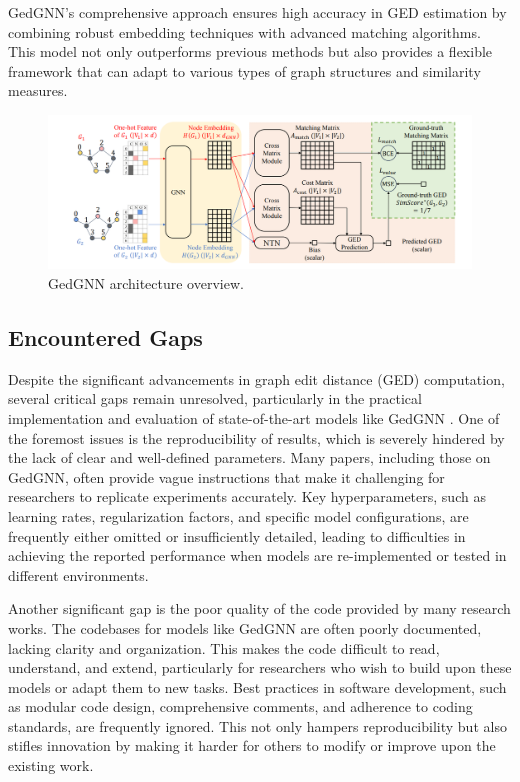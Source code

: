 \documentclass[../Thesis.tex]{subfiles}
\begin{document}
	GedGNN’s comprehensive approach ensures high accuracy in GED estimation by combining robust embedding techniques with advanced matching algorithms. This model not only outperforms previous methods but also provides a flexible framework that can adapt to various types of graph structures and similarity measures.
	
	\begin{figure}[H]
		\centering
		\includegraphics[width=\textwidth]{Images/gedgnn_architecture.png}
		\caption{GedGNN architecture overview.}
		\label{fig:gedgnn_architecture}
	\end{figure}
	
	\subsection{Encountered Gaps}
	
	Despite the significant advancements in graph edit distance (GED) computation, several critical gaps remain unresolved, particularly in the practical implementation and evaluation of state-of-the-art models like GedGNN \cite{computing_graph_edit_distance_via_neural_graph_matching}. One of the foremost issues is the reproducibility of results, which is severely hindered by the lack of clear and well-defined parameters. Many papers, including those on GedGNN, often provide vague instructions that make it challenging for researchers to replicate experiments accurately. Key hyperparameters, such as learning rates, regularization factors, and specific model configurations, are frequently either omitted or insufficiently detailed, leading to difficulties in achieving the reported performance when models are re-implemented or tested in different environments.
	
	Another significant gap is the poor quality of the code provided by many research works. The codebases for models like GedGNN are often poorly documented, lacking clarity and organization. This makes the code difficult to read, understand, and extend, particularly for researchers who wish to build upon these models or adapt them to new tasks. Best practices in software development, such as modular code design, comprehensive comments, and adherence to coding standards, are frequently ignored. This not only hampers reproducibility but also stifles innovation by making it harder for others to modify or improve upon the existing work.
	
\end{document}
